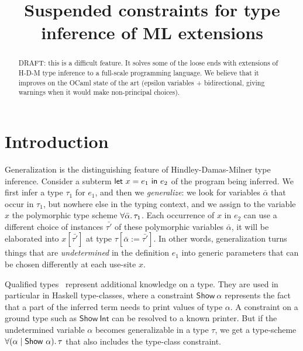 \documentclass[acmsmall,screen,nonacm]{acmart}
\begin{document}
\title{Suspended constraints for type inference of ML extensions}

\begin{abstract}
  DRAFT: this is a difficult feature. It solves some of the loose ends
  with extensions of H-D-M type inference to a full-scale programming
  language. We believe that it improves on the OCaml state of the art
  (epsilon variables + bidirectional, giving warnings when it would
  make non-principal choices).
\end{abstract}


\maketitle

\section{Introduction}

Generalization is the distinguishing feature of Hindley-Damas-Milner type inference. Consider a subterm $\mathsf{let} ~ x = e_1 ~ \mathsf{in} ~ e_2$ of the program being inferred. We first infer a type $\tau_1$ for $e_1$, and then we \emph{generalize}: we look for variables $\bar{\alpha}$ that occur in $\tau_1$, but nowhere else in the typing context, and we assign to the variable $x$ the polymorphic type scheme $\forall {\bar{\alpha}}.\,{\tau_1}$. Each occurrence of $x$ in $e_2$ can use a different choice of instances $\bar{\tau'}$ of these polymorphic variables $\bar{\alpha}$, it will be elaborated into $x [\bar{\tau'}]$ at type $\tau[\bar{\alpha} := \bar{\tau'}]$. In other words, generalization turns things that are \emph{undetermined} in the definition $e_1$ into generic parameters that can be chosen differently at each use-site $x$.

Qualified types~\citep*{TODO} represent additional knowledge on a type. They are used in particular in Haskell type-classes, where a constraint $\mathsf{Show}~\alpha$ represents the fact that a part of the inferred term needs to print values of type $\alpha$. A constraint on a ground type such as $\mathsf{Show}~\mathsf{Int}$ can be resolved to a known printer. But if the undetermined variable $\alpha$ becomes generalizable in a type $\tau$, we get a type-scheme $\forall {(\alpha \mid \mathsf{Show}~\alpha)}.\,{\tau}$ that also includes the type-class constraint.
\end{document}
